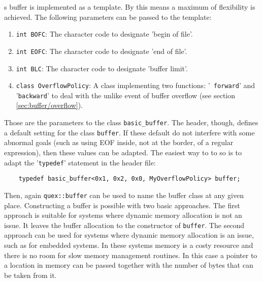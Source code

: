 {\Quex}s buffer is implemented as a template. By this means a maximum of
flexibility is achieved. The following parameters can be passed to the 
template:

\begin{enumerate}
\item {\tt int BOFC}: The character code to designate 'begin of file'.
\item {\tt int EOFC}: The character code to designate 'end of file'.
\item {\tt int BLC}: The character code to designate 'buffer limit'.
\item {\tt class OverflowPolicy}: A class implementing two functions: '{\tt
    forward}' and '{\tt backward}' to deal with the unlike event of buffer
    overflow (see section \ref{sec:buffer/overflow}).
\end{enumerate}

Those are the parameters to the class {\tt basic\_buffer}. The header, though,
defines a default setting for the class {\tt buffer}. If these default do
not interfere with some abnormal goals (such as using EOF inside, not at the border, of a regular
	expression), then these values can be adapted. The easiest way to to so
is to adapt the '{\tt typedef}' statement in the header file:

\begin{lstlisting}
    typedef basic_buffer<0x1, 0x2, 0x0, MyOverflowPolicy> buffer;
\end{lstlisting}

Then, again {\tt quex::buffer} can be used to name the buffer class at any given
place. Constructing a buffer is possible with two basic approaches. The first approach
is suitable for systems where dynamic memory allocation is not an issue. It leaves
the buffer allocation to the constructor of {\tt buffer}. The second approach 
can be used for systems where dynamic memory allocation is an issue, such as
for embedded systems. In these systems memory is a costy resource and there is
no room for slow memory management routines. In this case a pointer to a location
in memory can be passed together with the number of bytes that can be taken
from it.
